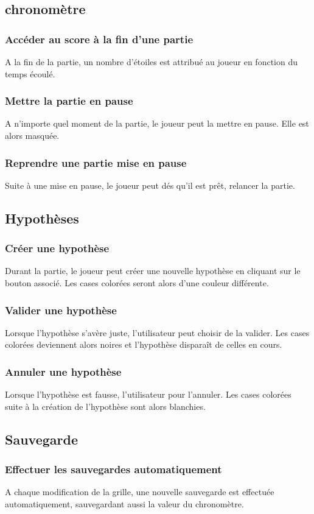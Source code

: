 \documentclass{report}
\begin{document}
    \subsection{chronomètre}
			\subsubsection{Accéder au score à la fin d'une partie}
				A la fin de la partie, un nombre d'étoiles est attribué au joueur en fonction du temps écoulé.
			\subsubsection{Mettre la partie en pause}
				A n'importe quel moment de la partie, le joueur peut la mettre en pause. Elle est alors masquée.
	        \subsubsection{Reprendre une partie mise en pause}
    			Suite à une mise en pause, le joueur peut dés qu'il est prêt, relancer la partie.
	\subsection{Hypothèses}
		\subsubsection{Créer une hypothèse}
			Durant la partie, le joueur peut créer une nouvelle hypothèse en cliquant sur le bouton associé. Les cases colorées seront alors d'une couleur différente.
		\subsubsection{Valider une hypothèse}
			Lorsque l'hypothèse s'avère juste, l'utilisateur peut choisir de la valider. Les cases colorées deviennent alors noires et l'hypothèse disparaît de celles en cours.
		\subsubsection{Annuler une hypothèse}
			Lorsque l'hypothèse est fausse, l'utilisateur pour l'annuler. Les cases colorées suite à la création de l'hypothèse sont alors blanchies.
		
	\subsection{Sauvegarde}
		\subsubsection{Effectuer les sauvegardes automatiquement}
			A chaque modification de la grille, une nouvelle sauvegarde est effectuée automatiquement, sauvegardant aussi la valeur du chronomètre.
\end{document}
